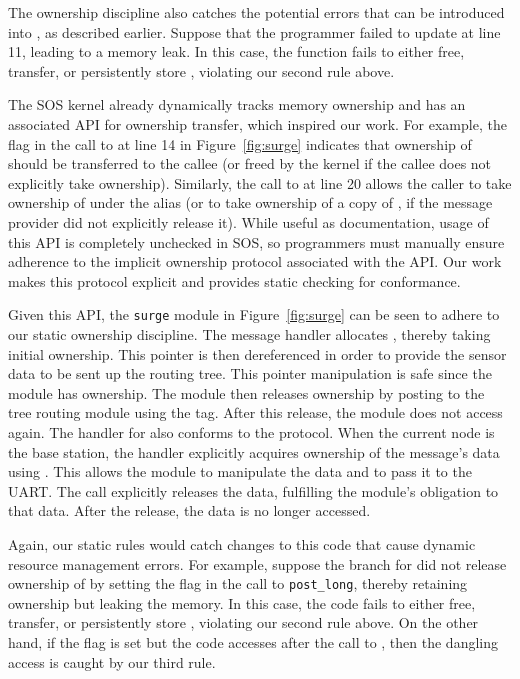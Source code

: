 The ownership discipline also catches the potential errors that can be
introduced into , as described earlier.  
%
Suppose that the programmer failed to update  at line 11,
leading to a memory leak.  
%
In this case, the  function fails to either free, transfer, or
persistently store , violating our second rule above.
 


The SOS kernel already dynamically tracks memory ownership and has an
associated API for ownership transfer, which inspired our work.  
%
For example, the  flag in the call to
 at line 14 in Figure~\ref{fig:surge} indicates that
ownership of  should be transferred to the callee (or freed by the
kernel if the callee does not explicitly take ownership).  
%
Similarly, the call to  at line 20 allows the
caller to take ownership of  under the alias  (or to
take ownership of a copy of , if the message provider did not
explicitly release it).  
%
While useful as documentation, usage of this API is completely unchecked in
SOS, so programmers must manually ensure adherence to the implicit ownership
protocol associated with the API.  
%
Our work makes this protocol explicit and provides static checking for
conformance.



Given this API, the {\tt surge} module in Figure~\ref{fig:surge} can be seen
to adhere to our static ownership discipline.  
%
The  message handler allocates , thereby
taking initial ownership. 
%
This pointer is then dereferenced in order to provide the sensor data to be
sent up the routing tree.  
%
This pointer manipulation is safe since the module has ownership.  
%
The module then releases ownership by posting  to the tree routing
module using the  tag.  
%
After this release, the module does not access  again. 
%
The handler for  also conforms to the protocol.   
%
When the current node is the base station, the handler explicitly acquires
ownership of the message's data using .  
%
This allows the module to manipulate the data and to pass it to the UART.  
%
The  call explicitly releases the data, fulfilling the
module's obligation to that data.
%
After the release, the data is no longer accessed.




Again, our static rules would catch changes to this code that cause dynamic
resource management errors.
%
For example, suppose the branch for  did not release
ownership of  by setting the  flag in the
call to {\tt post\_long}, thereby retaining ownership but leaking the
memory.    
%
In this case, the code fails to either free, transfer, or persistently store
, violating our second rule above.  
%
On the other hand, if the  flag is set but the code
accesses  after the call to , then the dangling
access is caught by our third rule.
 


